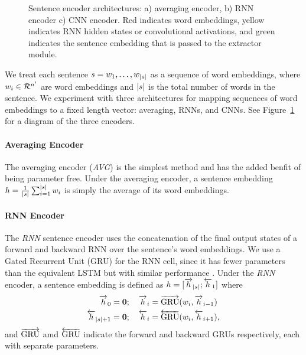 \begin{figure}
  \caption{Sentence encoder architectures: a) averaging encoder, b) RNN encoder
           c) CNN encoder. Red indicates word embeddings, yellow indicates
           RNN hidden states or convolutional activations, and green 
           indicates the sentence embedding that is passed to the extractor
           module.}
    \label{fig:encoders}
\end{figure}


We treat each sentence $\sent = \wordEmb[1], \ldots, \wordEmb[\sentSize]$
as a sequence of word embeddings, where 
$\wordEmb[i] \in \mathcal{R}^\wordEmbSize$ are word embeddings and
$\sentSize$ is the total number of words
in the sentence. We experiment with three architectures for mapping sequences
of word embeddings to a fixed length vector: averaging, RNNs, and CNNs.
See Figure~\ref{fig:encoders} for a diagram of the three encoders.

\paragraph{Averaging Encoder} The averaging encoder (\textit{AVG}) is the simplest
method and has the added benfit of being parameter free. 
Under the averaging encoder, a sentence embedding 
$\sentEmb = \frac{1}{\sentSize} \sum_{i=1}^{\sentSize} \wordEmb[i]$  
is simply the average of its word embeddings.
%

\paragraph{RNN Encoder} The \textit{RNN} sentence encoder uses the 
concatenation 
of the
final output states of a forward and backward RNN over the sentence's word
embeddings. We use a Gated Recurrent Unit (GRU)  
for the RNN cell,
since it has fewer parameters than the equivalent LSTM but with similar 
performance \cite{chung2014empirical}. 
Under the \textit{RNN} encoder, a sentence embedding is defined as
$\sentEmb = [\rSentEmb[\sentSize]; \lSentEmb[1]]$
where 
\begin{align} 
  \rSentEmb[0] = \mathbf{0} &;\quad 
       \rSentEmb[i] = \rgru(\wordEmb[i], \rSentEmb[i-1]) \\
  \lSentEmb[\sentSize + 1] = \mathbf{0} &;\quad 
       \lSentEmb[i] = \lgru(\wordEmb[i], \lSentEmb[i+1]),
\end{align}
and $\overrightarrow{\operatorname{GRU}}$ amd $\overleftarrow{\operatorname{GRU}}$ indicate the 
forward and backward GRUs respectively, each with separate 
parameters.

